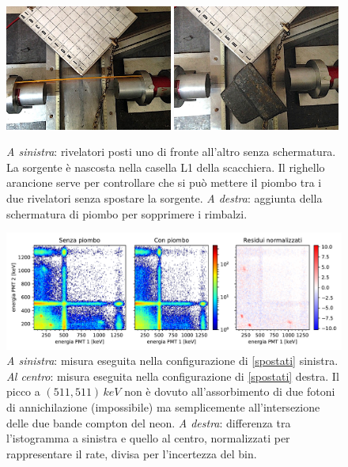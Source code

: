 \begin{figure}[h]
\centering
\subfloat
{\includegraphics[width=0.49\textwidth]{immagini/alter}}
\hfill
\subfloat
{\includegraphics[width=0.49\textwidth]{immagini/spostati2}}
\caption{
\emph{A sinistra}:
rivelatori posti uno di fronte all'altro senza schermatura.
La sorgente è nascosta nella casella L1 della scacchiera.
Il righello arancione serve per controllare che
si può mettere il piombo tra i due rivelatori senza spostare la sorgente.
\emph{A destra}: aggiunta della schermatura di piombo per sopprimere i rimbalzi.}
\label{spostati}
\end{figure}

\begin{figure}[h]
	\hspace{-0.25\textwidth}
	\includegraphics[width=1.5\textwidth]{immagini/diff}
	\caption{\emph{A sinistra}: misura eseguita nella configurazione di \autoref{spostati} sinistra.
	\emph{Al centro}: misura eseguita nella configurazione di \autoref{spostati} destra.
	Il picco a $(511, 511)\,\si{keV}$ non è dovuto all'assorbimento di due fotoni di annichilazione (impossibile)
	ma semplicemente all'intersezione delle due bande compton del neon.
	\emph{A destra}: differenza tra l'istogramma a sinistra e quello al centro,
	normalizzati per rappresentare il rate,
	divisa per l'incertezza del bin.}
	\label{spostato}
\end{figure}


